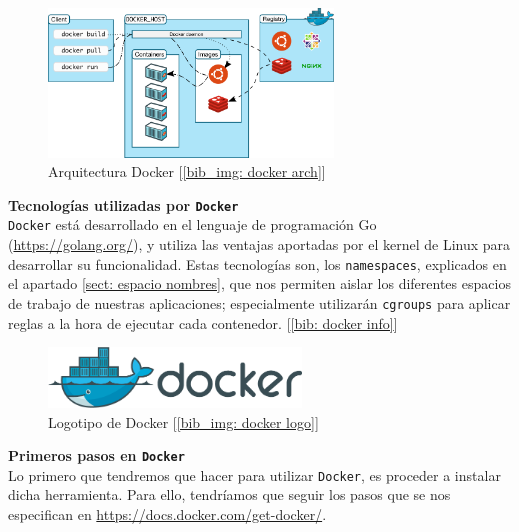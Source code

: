 \documentclass[12pt]{article}
\begin{document}
	\begin{figure}[h]
		\begin{center}
			\includegraphics[width=0.675\textwidth]{img/architecture-docker.png}
			\caption{Arquitectura Docker [\ref{bib_img: docker arch}]}
		\end{center}
	\end{figure}
	
	\pagebreak
	
	\noindent \textbf{\large Tecnologías utilizadas por \texttt{Docker}}\\
	
	\noindent \texttt{Docker} está desarrollado en el lenguaje de programación Go (\url{https://golang.org/}), y utiliza las ventajas aportadas por el kernel de Linux para desarrollar su funcionalidad. Estas tecnologías son, los \texttt{namespaces}, explicados en el apartado \ref{sect: espacio nombres}, que nos permiten aislar los diferentes espacios de trabajo de nuestras aplicaciones; especialmente utilizarán \texttt{cgroups} para aplicar reglas a la hora de ejecutar cada contenedor. [\ref{bib: docker info}]
	
	\vspace{10px}
	
	\begin{figure}[h]
		\begin{center}
			\includegraphics[width=0.6\textwidth]{img/docker_logo.png}
			\caption{Logotipo de Docker [\ref{bib_img: docker logo}]}
		\end{center}
	\end{figure}
	
	\vspace{10px}
	\noindent \textbf{\large Primeros pasos en \texttt{Docker}}\\
	
	\noindent Lo primero que tendremos que hacer para utilizar \texttt{Docker}, es proceder a instalar dicha herramienta. Para ello, tendríamos que seguir los pasos que se nos especifican en \url{https://docs.docker.com/get-docker/}. \\
	
\end{document}

